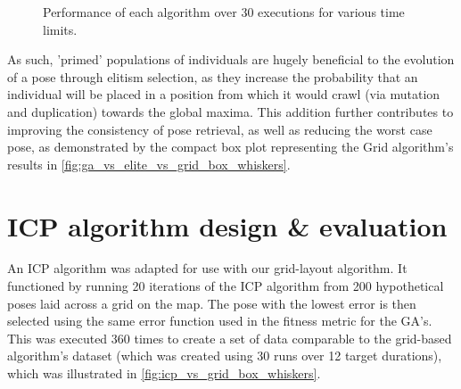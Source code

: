 \documentclass[authoryearcitations]{UoYCSproject}
\begin{document}
\begin{figure}
	\caption[Grid, Elitism, Benchmark time-adjusted performance.]{Performance of each algorithm over 30 executions for various time limits.}
	\label{fig:ga_vs_elite_vs_grid_box_whiskers}
\end{figure}

As such, 'primed' populations of individuals are hugely beneficial to the evolution of a pose through elitism selection, as they increase the probability that an individual will be placed in a position from which it would crawl (via mutation and duplication) towards the global maxima. This addition further contributes to improving the consistency of pose retrieval, as well as reducing the worst case pose, as demonstrated by the compact box plot representing the Grid algorithm's results in \autoref{fig:ga_vs_elite_vs_grid_box_whiskers}.




\chapter{ICP algorithm design \& evaluation}
\label{subsec:icp_benchmark}
An ICP algorithm \cite{Harry_undated-ea} was adapted for use with our grid-layout algorithm. It functioned by running 20 iterations of the ICP algorithm from 200 hypothetical poses laid across a grid on the map. The pose with the lowest error is then selected using the same error function used in the fitness metric for the GA's. This was executed 360 times to create a set of data comparable to the grid-based algorithm's dataset (which was created using 30 runs over 12 target durations), which was illustrated in \autoref{fig:icp_vs_grid_box_whiskers}. 
\end{document}
